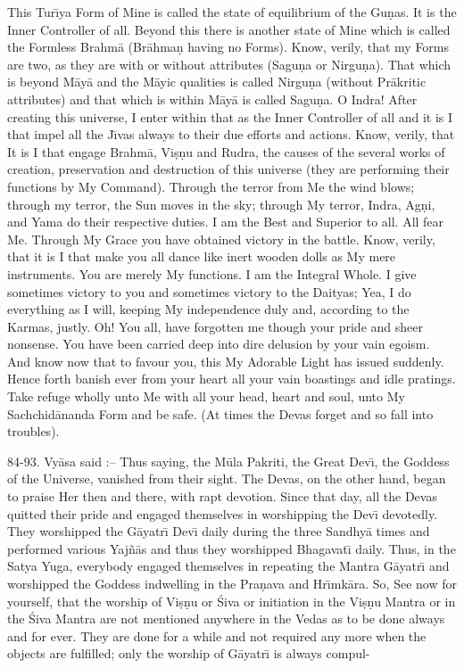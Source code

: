 This Tur\={\i}ya Form of Mine is called the state of equilibrium of the Gu\d{n}as. It is the Inner Controller of all. Beyond this there is another state of Mine which is called the Formless Brahm\=a (Br\=ahma\d{n} having no Forms). Know, verily, that my Forms are two, as they are with or without attributes (Sagu\d{n}a or Nirgu\d{n}a). That which is beyond M\=ay\=a and the M\=ayic qualities is called Nirgu\d{n}a (without Pr\=akritic attributes) and that which is within M\=ay\=a is called Sagu\d{n}a. O Indra! After creating this universe, I enter within that as the Inner Controller of all and it is I that impel all the J\={\i}vas always to their due efforts and actions. Know, verily, that It is I that engage Brahm\=a, Vi\d{s}\d{n}u and Rudra, the causes of the several works of creation, preservation and destruction of this universe (they are performing their functions by My Command). Through the terror from Me the wind blows; through my terror, the Sun moves in the sky; through My terror, Indra, Ag\d{n}i, and Yama do their respective duties. I am the Best and Superior to all. All fear Me. Through My Grace you have obtained victory in the battle. Know, verily, that it is I that make you all dance like inert wooden dolls as My mere instruments. You are merely My functions. I am the Integral Whole. I give sometimes victory to you and sometimes victory to the Daityas; Yea, I do everything as I will, keeping My independence duly and, according to the Karmas, justly. Oh! You all, have forgotten me though your pride and sheer nonsense. You have been carried deep into dire delusion by your vain egoism. And know now that to favour you, this My Adorable Light has issued suddenly. Hence forth banish ever from your heart all your vain boastings and idle pratings. Take refuge wholly unto Me with all your head, heart and soul, unto My Sachchid\=ananda Form and be safe. (At times the Devas forget and so fall into troubles).

84-93. Vy\=asa said :-- Thus saying, the M\=ula Pakriti, the Great Dev\={\i}, the Goddess of the Universe, vanished from their sight. The Devas, on the other hand, began to praise Her then and there, with rapt devotion. Since that day, all the Devas quitted their pride and engaged themselves in worshipping the Dev\={\i} devotedly. They worshipped the G\=ayatr\={\i} Dev\={\i} daily during the three Sandhy\=a times and performed various Yaj\~n\=as and thus they worshipped Bhagavat\={\i} daily. Thus, in the Satya Yuga, everybody engaged themselves in repeating the Mantra G\=ayatr\={\i} and worshipped the Goddess indwelling in the Pra\d{n}ava and Hr\={\i}mk\=ara. So, See now for yourself, that the worship of Vi\d{s}\d{n}u or \'Siva or initiation in the Vi\d{s}\d{n}u Mantra or in the \'Siva Mantra are not mentioned anywhere in the Vedas as to be done always and for ever. They are done for a while and not required any more when the objects are fulfilled; only the worship of G\=ayatr\={\i} is always compul-

